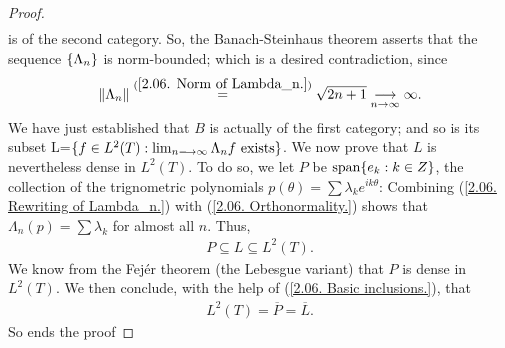 \begin{proof}
\begin{align}
{  } %
  \end{align}
%
is of the second category. %
So, the Banach-Steinhaus theorem  asserts that the sequence %
%
  $\{\Lambda_n\}$ %
%
is norm-bounded; which is a desired contradiction, since %
%
  \begin{align}
    \norm{\Lambda_n} \citeq{
      \ref{2.06. Norm of Lambda_n.}
    } \sqrt{2n + 1} \tendsto{n}{\infty}\infty.
%
  \end{align}
%
We have just established that $B$ is actually of the first category; %
and so is its subset %
%
  L=$\{f\in {L}^2(T): \lim_{n\longrightarrow\infty}\Lambda_n f \text{ exists}\}$. %
We now prove that $L$ is nevertheless dense in $L^2(T)$. %
To do so, we let $P$ be $\text{span}\{e_k: k\in Z\} $, %
the collection of the trignometric polynomials %
%
  $p(\theta)= \sum \lambda_k e^{ik\theta}$: %
%
Combining %
%
  (\ref{2.06. Rewriting of Lambda_n.}) with %
  (\ref{2.06. Orthonormality.}) %
%
shows that %
$\Lambda_n(p)= \sum \lambda_k$ for almost all $n$. %
Thus, 
%
  \begin{align}\label{2.06. Basic inclusions.}
    P \subseteq L \subseteq L^2(T).
  \end{align}
%
We know from the Fejér theorem (the Lebesgue variant) that %
$P$ is dense in $L^2(T)$. We then conclude, with the help of %
%
  (\ref{2.06. Basic inclusions.}), %
%
that %
%
  \begin{align}
    L^2(T) = \overline{P} = \overline{L}.
  \end{align}
%
So ends the proof
\end{proof}


